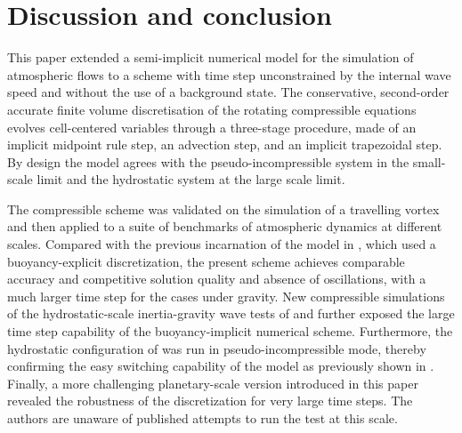 \documentclass{ametsoc}
\theoremstyle{definition}
\begin{document}

\section{Discussion and conclusion}
\label{sec:Conclusions}	

This paper extended a semi-implicit numerical model for the simulation of atmospheric flows to a scheme with time step unconstrained by the internal wave speed and without the use of a background state. The conservative, second-order accurate finite volume discretisation of the rotating compressible equations evolves cell-centered variables through a three-stage procedure, made of an implicit midpoint rule step, an advection step, and an implicit trapezoidal step. By design the model agrees with the pseudo-incompressible system in the small-scale limit and the hydrostatic system at the large scale limit.

The compressible scheme was validated on the simulation of a travelling vortex and then applied to a suite of benchmarks of atmospheric dynamics at different scales. Compared with the previous incarnation of the model in \cite{Benacchio2014, BenacchioEtAl2014}, which used a buoyancy-explicit discretization, the present scheme achieves comparable accuracy and competitive solution quality and absence of oscillations, with a much larger time step for the cases under gravity. New compressible simulations of the hydrostatic-scale inertia-gravity wave tests of \cite{BaldaufBrdar2013} and \cite{SkamarockKlemp1994} further exposed the large time step capability of the buoyancy-implicit numerical scheme. Furthermore, the hydrostatic configuration of \cite{SkamarockKlemp1994} was run in pseudo-incompressible mode, thereby confirming the easy switching capability of the model as previously shown in \cite{BenacchioEtAl2014, KleinBenacchio2016}. Finally, a more challenging planetary-scale version introduced in this paper revealed the robustness of the discretization for very large time steps. The authors are unaware of published attempts to run the test at this scale.
\end{document}
